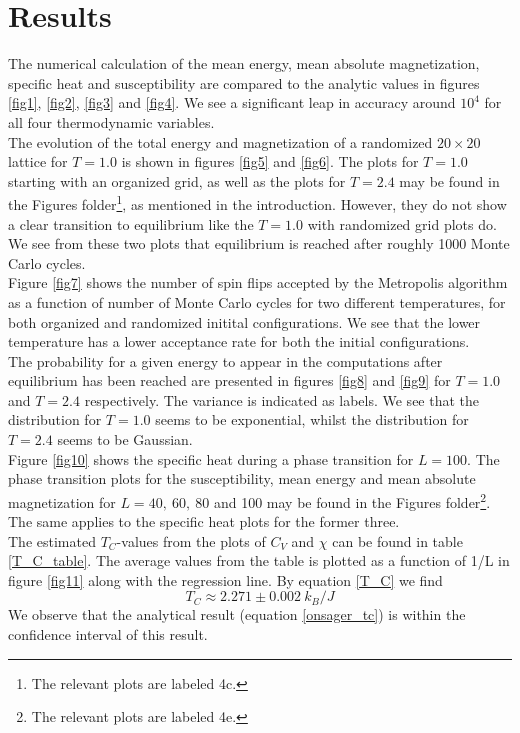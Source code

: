 \documentclass[notitlepage, reprint, nofootinbib]{revtex4-1}
\begin{document}
\section{Results}
The numerical calculation of the mean energy, mean absolute magnetization, specific heat and susceptibility are compared to the analytic values in figures \ref{fig1}, \ref{fig2}, \ref{fig3} and \ref{fig4}. We see a significant leap in accuracy around $10^4$ for all four thermodynamic variables. \\[2mm]
The evolution of the total energy and magnetization of a randomized $20\times20$ lattice for $T=1.0$ is shown in figures \ref{fig5} and \ref{fig6}. The plots for $T=1.0$ starting with an organized grid, as well as the plots for $T=2.4$ may be found in the Figures folder\footnote{The relevant plots are labeled 4c.}, as mentioned in the introduction. However, they do not show a clear transition to equilibrium like the $T=1.0$ with randomized grid plots do. We see from these two plots that equilibrium is reached after roughly 1000 Monte Carlo cycles. \\[2mm]
Figure \ref{fig7} shows the number of spin flips accepted by the Metropolis algorithm as a function of number of Monte Carlo cycles for two different temperatures, for both organized and randomized initital configurations. We see that the lower temperature has a lower acceptance rate for both the initial configurations.\\[2mm]
The probability for a given energy to appear in the computations after equilibrium has been reached are presented in figures \ref{fig8} and \ref{fig9} for $T=1.0$ and $T=2.4$ respectively. The variance is indicated as labels. We see that the distribution for $T=1.0$ seems to be exponential, whilst the distribution for $T=2.4$ seems to be Gaussian.\\[2mm]
Figure \ref{fig10} shows the specific heat during a phase transition for $L=100$. The phase transition plots for the susceptibility, mean energy and mean absolute magnetization for $L=40,\ 60,\ 80$ and 100 may be found in the Figures folder\footnote{The relevant plots are labeled 4e.}. The same applies to the specific heat plots for the former three.\\[2mm]
The estimated $T_C$-values from the plots of $C_V$ and $\chi$ can be found in table \ref{T_C_table}. The average values from the table is plotted as a function of 1/L in figure \ref{fig11} along with the regression line\cite{Squires}. By equation \ref{T_C} we find 
$$T_C\approx 2.271\pm0.002\ k_B/J$$
We observe that the analytical result (equation \ref{onsager_tc}) is within the confidence interval of this result.
\end{document}
